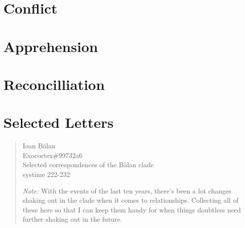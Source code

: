 \documentclass[11pt]{memoir}
\begin{document}
  
  
  
  
  
  
  
  

  \part{Conflict}

  
  
  
  
  
  
  
  
  

  \part{Apprehension}

  
  
  
  
  
  
  
  
  
  
  

  \part{Reconcilliation}

  

  \part*{Selected Letters}

  \begin{quote}
    Ioan Bălan \\
    Exocortex\#99732a6 \\
    Selected correspondences of the Bălan clade \\
    systime 222-232
    
    \emph{Note:} With the events of the last ten years, there's been a lot changes shaking out in the clade when it comes to relationships. Collecting all of these here so that I can keep them handy for when things doubtless need further shaking out in the future.
  \end{quote}

  

  \backmatter

  \markboth{}{}


  
\end{document}
